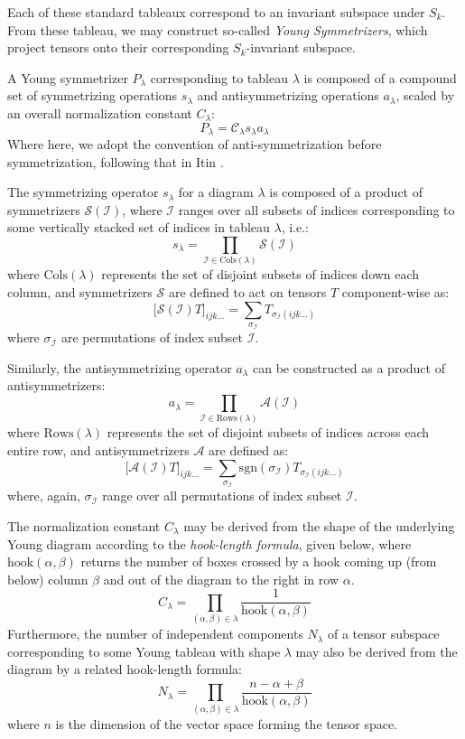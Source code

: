 \documentclass[]{report}
\begin{document}
Each of these standard tableaux correspond to an invariant subspace under $S_k$. From these tableau, we may construct so-called \textit{Young Symmetrizers}, which project tensors onto their corresponding $S_k$-invariant subspace. 

A Young symmetrizer $P_{\lambda}$ corresponding to tableau $\lambda$ is composed of a compound set of symmetrizing operations $s_{\lambda}$ and antisymmetrizing operations $a_{\lambda}$, scaled by an overall normalization constant $C_{\lambda}$:
$$
P_{\lambda} = \mathcal{C}_{\lambda}s_{\lambda}a_{\lambda}
$$
Where here, we adopt the convention of anti-symmetrization before symmetrization, following that in Itin \cite{Itin-r3}.

The symmetrizing operator $s_{\lambda}$ for a diagram $\lambda$ is composed of a product of symmetrizers $\mathcal{S}(\mathcal{I})$, where $\mathcal{I}$ ranges over all subsets of indices corresponding to some vertically stacked set of indices in tableau $\lambda$, i.e.:
$$
s_{\lambda} = \prod_{\mathcal{I}\in \text{Cols}(\lambda)}\mathcal{S}(\mathcal{I})
$$
where $\text{Cols}(\lambda)$ represents the set of disjoint subsets of indices down each column, and symmetrizers $\mathcal{S}$ are defined to act on tensors $T$ component-wise as:
$$
\big[\mathcal{S}(\mathcal{I})T\big]_{ijk...}= \sum_{\sigma_{\mathcal{I}}}T_{\sigma_{\mathcal{I}}(ijk...)}
$$
where $\sigma_{\mathcal{I}}$ are permutations of index subset $\mathcal{I}$.

Similarly, the antisymmetrizing operator $a_{\lambda}$ can be constructed as a product of antisymmetrizers:
$$
a_{\lambda} = \prod_{\mathcal{I}\in \text{Rows}(\lambda)}\mathcal{A}(\mathcal{I})
$$
where $\text{Rows}(\lambda)$ represents the set of  disjoint subsets of indices across each entire row, and antisymmetrizers $\mathcal{A}$ are defined as:
$$
\big[\mathcal{A}(\mathcal{I})T\big]_{ijk...}= \sum_{\sigma_{\mathcal{I}}}\text{sgn}(\sigma_{\mathcal{I}})T_{\sigma_{\mathcal{I}}(ijk...)}
$$
where, again, $\sigma_{\mathcal{I}}$ range over all permutations of index subset $\mathcal{I}$.



The normalization constant $C_{\lambda}$ may be derived from the shape of the underlying Young diagram according to the \textit{hook-length formula}, given below, where $\text{hook}(\alpha,\beta)$ returns the number of boxes crossed by a hook coming up (from below) column $\beta$ and out of the diagram to the right in row $\alpha$.
$$
C_{\lambda}= \prod_{(\alpha,\beta)\in \lambda}\frac{1}{\text{hook}(\alpha,\beta)}
$$
Furthermore, the number of independent components $N_{\lambda}$ of a tensor subspace corresponding to some Young tableau with shape $\lambda$ may also be derived from the diagram by a related hook-length formula:
$$
N_{\lambda}= \prod_{(\alpha,\beta)\in \lambda}\frac{n-\alpha+\beta}{\text{hook}(\alpha,\beta)}
$$
where $n$ is the dimension of the vector space forming the tensor space. 
\end{document}
